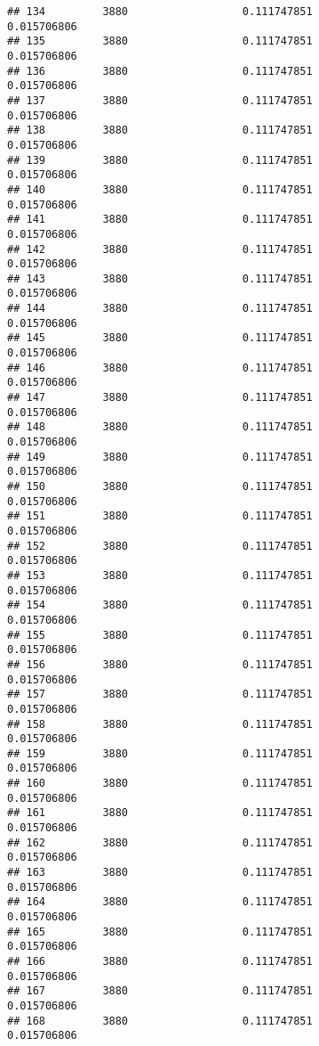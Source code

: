 \documentclass[]{article}
\begin{document}
\begin{verbatim}
## 134         3880                  0.111747851                0.015706806
## 135         3880                  0.111747851                0.015706806
## 136         3880                  0.111747851                0.015706806
## 137         3880                  0.111747851                0.015706806
## 138         3880                  0.111747851                0.015706806
## 139         3880                  0.111747851                0.015706806
## 140         3880                  0.111747851                0.015706806
## 141         3880                  0.111747851                0.015706806
## 142         3880                  0.111747851                0.015706806
## 143         3880                  0.111747851                0.015706806
## 144         3880                  0.111747851                0.015706806
## 145         3880                  0.111747851                0.015706806
## 146         3880                  0.111747851                0.015706806
## 147         3880                  0.111747851                0.015706806
## 148         3880                  0.111747851                0.015706806
## 149         3880                  0.111747851                0.015706806
## 150         3880                  0.111747851                0.015706806
## 151         3880                  0.111747851                0.015706806
## 152         3880                  0.111747851                0.015706806
## 153         3880                  0.111747851                0.015706806
## 154         3880                  0.111747851                0.015706806
## 155         3880                  0.111747851                0.015706806
## 156         3880                  0.111747851                0.015706806
## 157         3880                  0.111747851                0.015706806
## 158         3880                  0.111747851                0.015706806
## 159         3880                  0.111747851                0.015706806
## 160         3880                  0.111747851                0.015706806
## 161         3880                  0.111747851                0.015706806
## 162         3880                  0.111747851                0.015706806
## 163         3880                  0.111747851                0.015706806
## 164         3880                  0.111747851                0.015706806
## 165         3880                  0.111747851                0.015706806
## 166         3880                  0.111747851                0.015706806
## 167         3880                  0.111747851                0.015706806
## 168         3880                  0.111747851                0.015706806

\end{verbatim}
\end{document}

